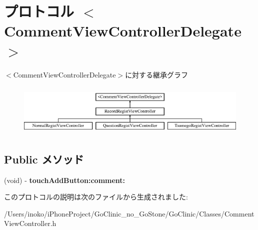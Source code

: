 \hypertarget{protocol_comment_view_controller_delegate-p}{
\section{プロトコル $<$CommentViewControllerDelegate$>$}
\label{protocol_comment_view_controller_delegate-p}
}
$<$CommentViewControllerDelegate$>$に対する継承グラフ\begin{figure}[H]
\begin{center}
\leavevmode
\includegraphics[height=2.557078cm]{protocol_comment_view_controller_delegate-p}
\end{center}
\end{figure}
\subsection*{Public メソッド}
\begin{DoxyCompactItemize}
\item 
\hypertarget{protocol_comment_view_controller_delegate-p_ab789646449c74edf24bd41daa7898f2f}{
(void) -\/ {\bfseries touchAddButton:comment:}}
\label{protocol_comment_view_controller_delegate-p_ab789646449c74edf24bd41daa7898f2f}

\end{DoxyCompactItemize}


このプロトコルの説明は次のファイルから生成されました:\begin{DoxyCompactItemize}
\item 
/Users/inoko/iPhoneProject/GoClinic\_\-no\_\-GoStone/GoClinic/Classes/CommentViewController.h\end{DoxyCompactItemize}
